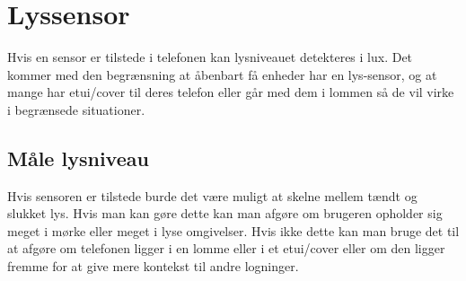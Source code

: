 \section{Lyssensor}
Hvis en sensor er tilstede i telefonen kan lysniveauet detekteres i lux. Det kommer med den begrænsning at åbenbart få enheder har en lys-sensor, og at mange har etui/cover til deres telefon eller går med dem i lommen så de vil virke i begrænsede situationer.

\subsection{Måle lysniveau}
Hvis sensoren er tilstede burde det være muligt at skelne mellem tændt og slukket lys. Hvis man kan gøre dette kan man afgøre om brugeren opholder sig meget i mørke eller meget i lyse omgivelser. Hvis ikke dette kan man bruge det til at afgøre om telefonen ligger i en lomme eller i et etui/cover eller om den ligger fremme for at give mere kontekst til andre logninger.

